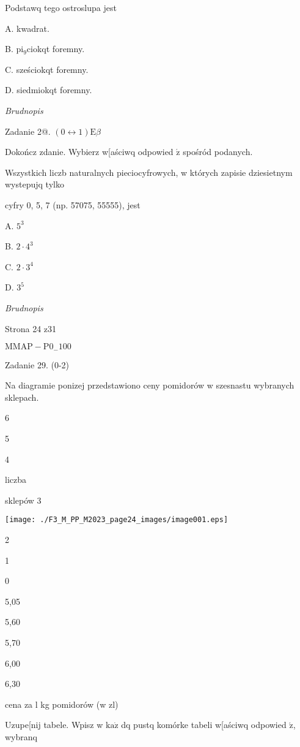 \documentclass[a4paper,12pt]{article}
\begin{document}
Podstawq tego ostroslupa jest

A. kwadrat.

B. $\mathrm{p}\mathrm{i}_{9}$ciokqt foremny.

C. sześciokqt foremny.

D. siedmiokqt foremny.

{\it Brudnopis}

Zadanie 2@. $(0\leftrightarrow 1) \mathrm{E} \beta$

Dokończ zdanie. Wybierz w[aściwq odpowied $\acute{\mathrm{z}}$ spośród podanych.

Wszystkich liczb naturalnych pieciocyfrowych, w których zapisie dziesietnym wystepujq tylko

cyfry 0, 5, 7 (np. 57075, 55555), jest

A. $5^{3}$

B. $2\cdot 4^{3}$

C. $2\cdot 3^{4}$

D. $3^{5}$

{\it Brudnopis}

Strona 24 z31

$\mathrm{M}\mathrm{M}\mathrm{A}\mathrm{P}-\mathrm{P}0_{-}100$





Zadanie 29. (0-2)

Na diagramie ponizej przedstawiono ceny pomidorów w szesnastu wybranych sklepach.

6

5

4

liczba

sklepów 3
\begin{center}
\texttt{[image: ./F3\_M\_PP\_M2023\_page24\_images/image001.eps]}
\end{center}
2

1

0

5,05

5,60

5,70

6,00

6,30

cena za l kg pomidorów (w zl)

Uzupe[nij tabele. Wpisz w $\mathrm{k}\mathrm{a}\dot{\mathrm{z}}$ dq pustq komórke tabeli w[aściwq odpowied $\acute{\mathrm{z}}$, wybranq
\end{document}

